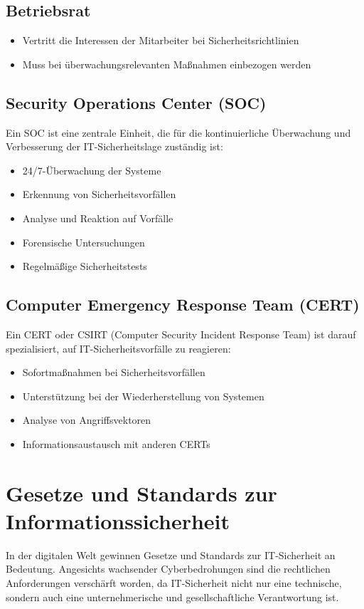 \documentclass{orgstandard}
\begin{document}
\subsection{Betriebsrat}
\label{sec:orgabb5339}
\begin{itemize}
\item Vertritt die Interessen der Mitarbeiter bei Sicherheitsrichtlinien
\item Muss bei überwachungsrelevanten Maßnahmen einbezogen werden
\end{itemize}
\subsection{Security Operations Center (SOC)}
\label{sec:org03e31b6}
Ein SOC ist eine zentrale Einheit, die für die kontinuierliche Überwachung und Verbesserung der IT-Sicherheitslage zuständig ist:
\begin{itemize}
\item 24/7-Überwachung der Systeme
\item Erkennung von Sicherheitsvorfällen
\item Analyse und Reaktion auf Vorfälle
\item Forensische Untersuchungen
\item Regelmäßige Sicherheitstests
\end{itemize}
\subsection{Computer Emergency Response Team (CERT)}
\label{sec:orgbe69aab}
Ein CERT oder CSIRT (Computer Security Incident Response Team) ist darauf spezialisiert, auf IT-Sicherheitsvorfälle zu reagieren:
\begin{itemize}
\item Sofortmaßnahmen bei Sicherheitsvorfällen
\item Unterstützung bei der Wiederherstellung von Systemen
\item Analyse von Angriffsvektoren
\item Informationsaustausch mit anderen CERTs
\end{itemize}
\section{Gesetze und Standards zur Informationssicherheit}
\label{sec:org44f59a0}

In der digitalen Welt gewinnen Gesetze und Standards zur IT-Sicherheit an Bedeutung. Angesichts wachsender Cyberbedrohungen sind die rechtlichen Anforderungen verschärft worden, da IT-Sicherheit nicht nur eine technische, sondern auch eine unternehmerische und gesellschaftliche Verantwortung ist.
\end{document}

